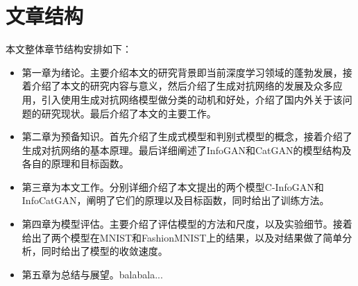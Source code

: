 \section{文章结构}
本文整体章节结构安排如下：
\begin{itemize}
  \item 第一章为绪论。主要介绍本文的研究背景即当前深度学习领域的蓬勃发展，接着介绍了本文的研究内容与意义，然后介绍了生成对抗网络的发展及众多应用，引入使用生成对抗网络模型做分类的动机和好处，介绍了国内外关于该问题的研究现状。最后介绍了本文的主要工作。
  \item 第二章为预备知识。首先介绍了生成式模型和判别式模型的概念，接着介绍了生成对抗网络的基本原理。最后详细阐述了InfoGAN和CatGAN的模型结构及各自的原理和目标函数。
  \item 第三章为本文工作。分别详细介绍了本文提出的两个模型C-InfoGAN和InfoCatGAN，阐明了它们的原理以及目标函数，同时给出了训练方法。
  \item 第四章为模型评估。主要介绍了评估模型的方法和尺度，以及实验细节。接着给出了两个模型在MNIST和FashionMNIST上的结果，以及对结果做了简单分析，同时给出了模型的收敛速度。
  \item 第五章为总结与展望。balabala...
\end{itemize}